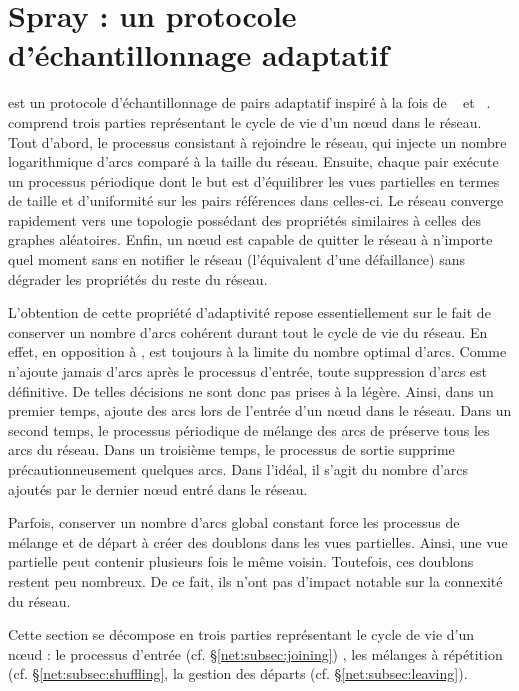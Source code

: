 
\section{Spray : un protocole d'échantillonnage adaptatif}
\label{net:sec:spray}

\SPRAY est un protocole d'échantillonnage de pairs adaptatif inspiré à
la fois de \SCAMP~\cite{ganesh2003peer} et
\CYCLON~\cite{voulgaris2005cyclon}. \SPRAY comprend trois parties représentant
le cycle de vie d'un nœud dans le réseau. Tout d'abord, le processus consistant
à rejoindre le réseau, qui injecte un nombre logarithmique d'arcs comparé à la
taille du réseau.  Ensuite, chaque pair exécute un processus périodique dont le
but est d'équilibrer les vues partielles en termes de taille et d'uniformité sur
les pairs références dans celles-ci. Le réseau converge rapidement vers une
topologie possédant des propriétés similaires à celles des graphes
aléatoires. Enfin, un nœud est capable de quitter le réseau à n'importe quel
moment sans en notifier le réseau (l'équivalent d'une défaillance) sans dégrader
les propriétés du reste du réseau.

L'obtention de cette propriété d'adaptivité repose essentiellement sur le fait
de conserver un nombre d'arcs cohérent durant tout le cycle de vie du réseau.
En effet, en opposition à \CYCLON, \SPRAY est toujours à la limite du nombre
optimal d'arcs. Comme \SPRAY n'ajoute jamais d'arcs après le processus d'entrée,
toute suppression d'arcs est définitive. De telles décisions ne sont donc pas
prises à la légère. Ainsi, dans un premier temps, \SPRAY ajoute des arcs lors de
l'entrée d'un nœud dans le réseau. Dans un second temps, le processus périodique
de mélange des arcs de \SPRAY préserve tous les arcs du réseau.  Dans un
troisième temps, le processus de sortie supprime précautionneusement quelques
arcs. Dans l'idéal, il s'agit du nombre d'arcs ajoutés par le dernier nœud entré
dans le réseau.

Parfois, conserver un nombre d'arcs global constant force les processus de
mélange et de départ à créer des doublons dans les vues partielles. Ainsi, une
vue partielle peut contenir plusieurs fois le même voisin. Toutefois, ces
doublons restent peu nombreux. De ce fait, ils n'ont pas d'impact notable sur la
connexité du réseau.

Cette section se décompose en trois parties représentant le cycle de vie d'un
nœud : le processus d'entrée (cf. §\ref{net:subsec:joining}) , les mélanges à
répétition (cf. §\ref{net:subsec:shuffling}, la gestion des départs
(cf. §\ref{net:subsec:leaving}).

